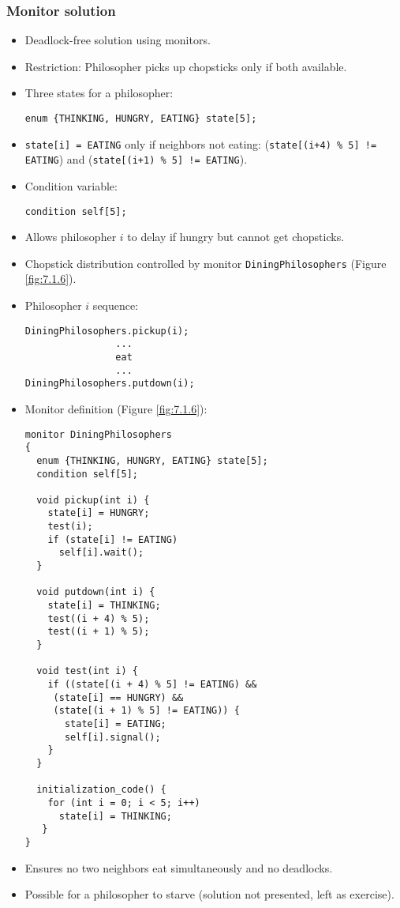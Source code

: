 \begin{itemize}
    \subsubsection{Monitor solution}
    \begin{itemize}
        \item Deadlock-free solution using monitors.
        \item Restriction: Philosopher picks up chopsticks only if both available.
        \item Three states for a philosopher:
        \begin{verbatim}
enum {THINKING, HUNGRY, EATING} state[5];
\end{verbatim}
        \item \texttt{state[i] = EATING} only if neighbors not eating: (\texttt{state[(i+4) \% 5] != EATING}) and (\texttt{state[(i+1) \% 5] != EATING}).
        \item Condition variable:
        \begin{verbatim}
condition self[5];
\end{verbatim}
        \item Allows philosopher $i$ to delay if hungry but cannot get chopsticks.
        \item Chopstick distribution controlled by monitor \texttt{DiningPhilosophers} (Figure \ref{fig:7.1.6}).
        \item Philosopher $i$ sequence:
        \begin{verbatim}
DiningPhilosophers.pickup(i);
                ...
                eat
                ...
DiningPhilosophers.putdown(i);
\end{verbatim}
        \item Monitor definition (Figure \ref{fig:7.1.6}):
        \begin{verbatim}
monitor DiningPhilosophers
{
  enum {THINKING, HUNGRY, EATING} state[5];
  condition self[5];
 
  void pickup(int i) {
    state[i] = HUNGRY;
    test(i);
    if (state[i] != EATING)
      self[i].wait();
  }
 
  void putdown(int i) {
    state[i] = THINKING;
    test((i + 4) % 5);
    test((i + 1) % 5);
  }
 
  void test(int i) {
    if ((state[(i + 4) % 5] != EATING) &&
     (state[i] == HUNGRY) &&
     (state[(i + 1) % 5] != EATING)) {
       state[i] = EATING;
       self[i].signal();
    }
  }
 
  initialization_code() {
    for (int i = 0; i < 5; i++)
      state[i] = THINKING;
   }
}
        \end{verbatim}
        \item Ensures no two neighbors eat simultaneously and no deadlocks.
        \item Possible for a philosopher to starve (solution not presented, left as exercise).
    \end{itemize}
\end{itemize}

